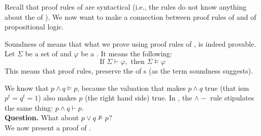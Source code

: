 \documentclass[english, 11pt]{article}
\begin{document}
    Recall that proof rules of  are syntactical (i.e., the rules do not know anything about the  of ). We now want to make a connection between proof rules of  and  of propositional logic.

  \begin{defn}[soundness]\label{soundness}
        Soundness of  means that what we prove using proof rules of , is indeed provable. Let $\Sigma$ be a set of  and $\varphi$ be a . It means the following:
        \[ \mbox{If } \Sigma \vdash \varphi, \mbox{ \ then \ } \Sigma \models \varphi \]
        This means that  proof rules, preserve the  of s (as the term soundness suggests).
  \end{defn}


  We know that $p \land q \models p$, because the valuation that makes $p \land q$ true (that ism $p^t = q^t = 1$) also makes $p$ (the right hand side) true. In , the $\land -$ rule stipulates the same thing: $p \land q \vdash p$. \\

  \textbf{Question.} What about $p \lor q \not \models p$? \\

  We now present a proof of .
\end{document}
